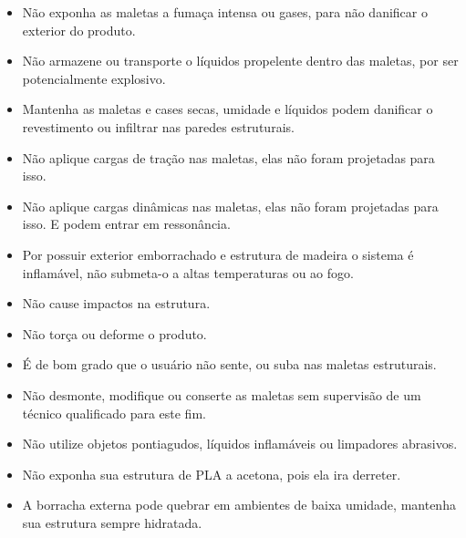 \begin{itemize}
    \item Não exponha as maletas a fumaça intensa ou gases, para não danificar o exterior do produto.
    \item Não armazene ou transporte o líquidos propelente dentro das maletas, por ser potencialmente explosivo.
    \item Mantenha as maletas e cases secas, umidade e líquidos podem danificar o revestimento ou infiltrar nas paredes estruturais.
    \item Não aplique cargas de tração nas maletas, elas não foram projetadas para isso.
    \item Não aplique cargas dinâmicas nas maletas, elas não foram projetadas para isso. E podem entrar em ressonância.
    \item Por possuir exterior emborrachado e estrutura de madeira o sistema é inflamável, não submeta-o a altas temperaturas ou ao fogo.
    \item Não cause impactos na estrutura.
    \item Não torça ou deforme o produto.
    \item É de bom grado que o usuário não sente, ou suba nas maletas estruturais.
    \item Não desmonte, modifique ou conserte as maletas sem supervisão de um técnico qualificado para este fim.
    \item Não utilize objetos pontiagudos, líquidos inflamáveis ou limpadores abrasivos.
    \item Não exponha sua estrutura de PLA a acetona, pois ela ira derreter.
    \item A borracha externa pode quebrar em ambientes de baixa umidade, mantenha sua estrutura sempre hidratada.
\end{itemize}
